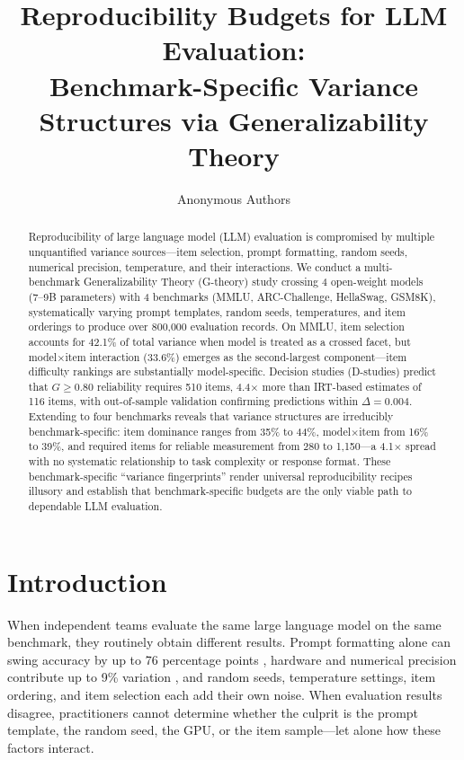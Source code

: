\documentclass[11pt]{article}
\title{Reproducibility Budgets for LLM Evaluation:\\
Benchmark-Specific Variance Structures via Generalizability Theory}
\author{
  Anonymous Authors
}
\date{}
\begin{document}
\maketitle

\begin{abstract}
Reproducibility of large language model (LLM) evaluation is compromised by multiple unquantified variance sources---item selection, prompt formatting, random seeds, numerical precision, temperature, and their interactions.
We conduct a multi-benchmark Generalizability Theory (G-theory) study crossing 4 open-weight models (7--9B parameters) with 4 benchmarks (MMLU, ARC-Challenge, HellaSwag, GSM8K), systematically varying prompt templates, random seeds, temperatures, and item orderings to produce over 800,000 evaluation records.
On MMLU, item selection accounts for 42.1\% of total variance when model is treated as a crossed facet, but model$\times$item interaction (33.6\%) emerges as the second-largest component---item difficulty rankings are substantially model-specific.
Decision studies (D-studies) predict that $G \geq 0.80$ reliability requires 510 items, 4.4$\times$ more than IRT-based estimates of 116 items, with out-of-sample validation confirming predictions within $\Delta = 0.004$.
Extending to four benchmarks reveals that variance structures are irreducibly benchmark-specific: item dominance ranges from 35\% to 44\%, model$\times$item from 16\% to 39\%, and required items for reliable measurement from 280 to 1{,}150---a 4.1$\times$ spread with no systematic relationship to task complexity or response format.
These benchmark-specific ``variance fingerprints'' render universal reproducibility recipes illusory and establish that benchmark-specific budgets are the only viable path to dependable LLM evaluation.
\end{abstract}

\section{Introduction}

When independent teams evaluate the same large language model on the same benchmark, they routinely obtain different results.
Prompt formatting alone can swing accuracy by up to 76 percentage points \citep{sclar2024}, hardware and numerical precision contribute up to 9\% variation \citep{yuan2025}, and random seeds, temperature settings, item ordering, and item selection each add their own noise.
When evaluation results disagree, practitioners cannot determine whether the culprit is the prompt template, the random seed, the GPU, or the item sample---let alone how these factors interact.
\end{document}
